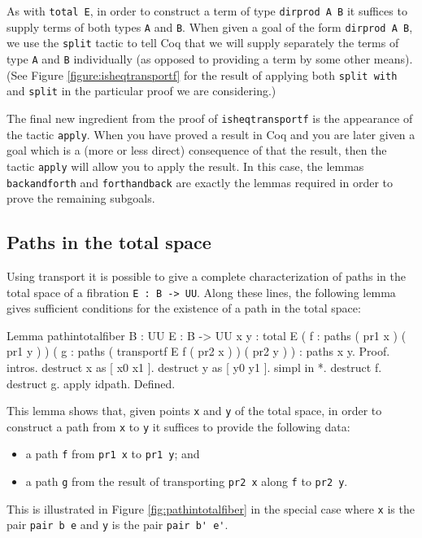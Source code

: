 As with \verb|total E|, in order to construct a term of type
\verb|dirprod A B| it suffices to supply terms of both types
\verb|A| and \verb|B|.  When given a goal of
the form \verb|dirprod A B|, we use the \verb|split| tactic
to tell Coq that we will supply separately the
terms of type \verb|A| and \verb|B| individually (as opposed
to providing a term by some other means).  (See Figure \ref{figure:isheqtransportf}
for the result of applying both \verb|split with| and
\verb|split| in the particular proof we are considering.)

The final new ingredient from the proof of \verb|isheqtransportf|
is the appearance of the tactic \verb|apply|.  When you have
proved a result in Coq and you are later
given a goal which is a (more or less direct) consequence of that
the result, then the tactic \verb|apply| will allow
you to apply the result.  In this case, the lemmas
\verb|backandforth| and \verb|forthandback| are exactly the
lemmas required in order to prove the remaining subgoals.

\subsection{Paths in the total space}

Using transport it is possible to give a complete characterization of
paths in the total space of a fibration \verb|E : B -> UU|.
Along these lines, the following lemma gives sufficient conditions for
the existence of a path in the total space:
\begin{center}
  \begin{coqcode}
Lemma pathintotalfiber { B : UU } { E : B -> UU } { x y : total E } ( f : paths ( pr1 x ) ( pr1 y ) ) ( g : paths ( transportf E f ( pr2 x ) ) ( pr2 y ) ) : paths x y.
Proof.
  intros. destruct x as [ x0 x1 ]. destruct y as [ y0 y1 ].  
  simpl in *. destruct f. destruct g. apply idpath.
Defined.
  \end{coqcode}
\end{center}
This lemma shows that, given points \verb|x| and \verb|y| of
the total space, in order to construct a path from \verb|x| to
\verb|y| it suffices to provide the following data:
\begin{itemize}
\item a path \verb|f| from \verb|pr1 x| to \verb|pr1 y|; and
\item a path \verb|g| from the result of transporting
  \verb|pr2 x| along \verb|f| to \verb|pr2 y|. 
\end{itemize}
This is illustrated in Figure \ref{fig:pathintotalfiber} in the
special case where \verb|x| is the pair \verb|pair b e| and
\verb|y| is the pair \verb|pair b' e'|.

